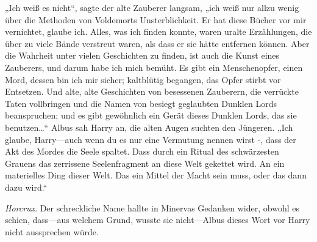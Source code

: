 „Ich weiß es nicht“, sagte der alte Zauberer langsam, „ich weiß nur allzu wenig über die Methoden von Voldemorts Unsterblichkeit. Er hat diese Bücher vor mir vernichtet, glaube ich. Alles, was ich finden konnte, waren uralte Erzählungen, die über zu viele Bände verstreut waren, als dass er sie hätte entfernen können. Aber die Wahrheit unter vielen Geschichten zu finden, ist auch die Kunst eines Zauberers, und darum habe ich mich bemüht. Es gibt ein Menschenopfer, einen Mord, dessen bin ich mir sicher; kaltblütig begangen, das Opfer stirbt vor Entsetzen. Und alte, alte Geschichten von besessenen Zauberern, die verrückte Taten vollbringen und die Namen von besiegt geglaubten Dunklen Lords beanspruchen; und es gibt gewöhnlich ein Gerät dieses Dunklen Lords, das sie benutzen…“
Albus sah Harry an, die alten Augen suchten den Jüngeren.
„Ich glaube, Harry—auch wenn du es nur eine Vermutung nennen wirst -, dass der Akt des Mordes die Seele spaltet. Dass durch ein Ritual des schwärzesten Grauens das zerrissene Seelenfragment an diese Welt gekettet wird. An ein materielles Ding dieser Welt. Das ein Mittel der Macht sein muss, oder das dann dazu wird.“

\emph{Horcrux}. Der schreckliche Name hallte in Minervas Gedanken wider, obwohl es schien, dass—aus welchem Grund, wusste sie nicht—Albus dieses Wort vor Harry nicht aussprechen würde.

